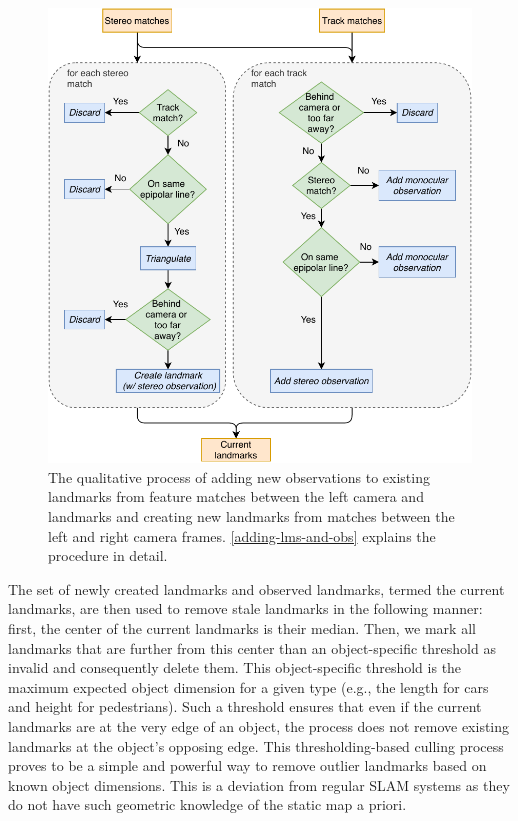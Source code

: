 \documentclass[headsepline, hidelinks, footsepline, footinclude=false, oneside, fontsize=11pt, paper=a4, listof=totoc, bibliography=totoc]{scrbook}
\begin{document}
\begin{figure}[htbp]
\centering
\includegraphics[width=.9\linewidth]{figures/add-lm-and-obs-flow.pdf}
\caption{\label{fig:add-lm-and-obs}The qualitative process of adding new observations to existing landmarks from feature matches between the left camera and landmarks and creating new landmarks from matches between the left and right camera frames. \cref{adding-lms-and-obs} explains the procedure in detail.}
\end{figure}


The set of newly created landmarks and observed landmarks, termed the current landmarks, are then used to remove stale landmarks in the following manner:
first, the center of the current landmarks is their median. 
Then, we mark all landmarks that are further from this center than an object-specific threshold as invalid and consequently delete them.
This object-specific threshold is the maximum expected object dimension for a given type (e.g., the length for cars and height for pedestrians).
Such a threshold ensures that even if the current landmarks are at the very edge of an object, the process does not remove existing landmarks at the object's opposing edge. 
This thresholding-based culling process proves to be a simple and powerful way to remove outlier landmarks based on known object dimensions. 
This is a deviation from regular SLAM systems as they do not have such geometric knowledge of the static map a priori.
\end{document}
